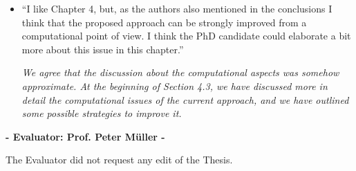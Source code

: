 \documentclass[11pt]{letter}
\begin{document}
\begin{itemize}
%
\item ``I like Chapter 4, but, as the authors also mentioned in the conclusions I think that the proposed approach can be strongly improved from a computational point of view. I think the PhD candidate could elaborate a bit more about this issue in this chapter.''\vskip1mm

{\em 
	We agree that the discussion about the computational aspects was somehow approximate. At the beginning of Section 4.3, we have discussed more in detail the computational issues of the current approach, and we have outlined some possible strategies to improve it.
}
\vskip3mm



\end{itemize}
\vskip10mm
\begin{center}
{\large\bf - Evaluator: Prof. Peter M\"uller -}
\end{center}

The Evaluator did not request any edit of the Thesis.

%
\end{document}
